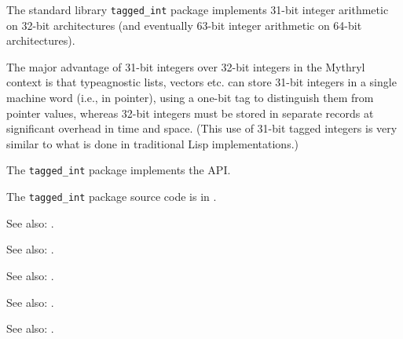 
The standard library {\tt tagged\_int} package implements 31-bit integer arithmetic 
on 32-bit architectures (and eventually 63-bit integer arithmetic on 64-bit architectures).

The major advantage of 31-bit integers over 32-bit integers in the Mythryl 
context is that typeagnostic lists, vectors etc. can store 31-bit 
integers in a single machine word (i.e., in pointer), using a one-bit tag 
to distinguish them from pointer values, whereas 32-bit integers must be 
stored in separate records at significant overhead in time and space. 
(This use of 31-bit tagged integers is very similar to what is done in 
traditional Lisp implementations.)

The {\tt tagged\_int} package implements the  API.

The {\tt tagged\_int} package source code is in .

See also:  .

See also:  .

See also:  .

See also:  .

See also:  .



